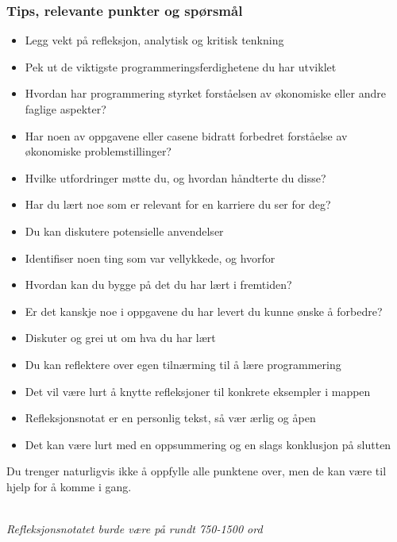 \documentclass[12pt, titlepage]{article}
\begin{document}
\subsubsection*{Tips, relevante punkter og spørsmål}
\begin{itemize}
   \item{Legg vekt på refleksjon, analytisk og kritisk tenkning}
   \item{Pek ut de viktigste programmeringsferdighetene du har utviklet}
   \item{Hvordan har programmering styrket forståelsen av økonomiske eller andre faglige aspekter?}
   \item{Har noen av oppgavene eller casene bidratt forbedret forståelse av økonomiske problemstillinger?}
   \item{Hvilke utfordringer møtte du, og hvordan håndterte du disse?}
   \item{Har du lært noe som er relevant for en karriere du ser for deg?}
   \item{Du kan diskutere potensielle anvendelser}
   \item{Identifiser noen ting som var vellykkede, og hvorfor}
   \item{Hvordan kan du bygge på det du har lært i fremtiden?}
   \item{Er det kanskje noe i oppgavene du har levert du kunne ønske å forbedre?}
   \item{Diskuter og grei ut om hva du har lært}
   \item{Du kan reflektere over egen tilnærming til å lære programmering}
   \item{Det vil være lurt å knytte refleksjoner til konkrete eksempler i mappen}
   \item{Refleksjonsnotat er en personlig tekst, så vær ærlig og åpen}
   \item{Det kan være lurt med en oppsummering og en slags konklusjon på slutten}
\end{itemize}

Du trenger naturligvis ikke å oppfylle alle punktene over, men de kan være til hjelp for å komme i gang.

~\\
\textit{Refleksjonsnotatet burde være på rundt 750-1500 ord}
\end{document}
